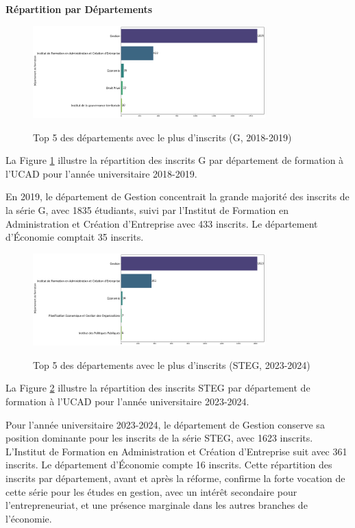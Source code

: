 \textbf{Répartition par Départements}

\begin{figure}[ht]
\centering
\caption{Top 5 des départements avec le plus d'inscrits (G, 2018-2019)}
\includegraphics[width=0.8\textwidth]{figure/dep_G_2019.png}
\label{fig:dep_g_2019}
\end{figure}

La Figure \ref{fig:dep_g_2019} illustre la répartition des inscrits G par département de formation à l'UCAD pour l'année universitaire 2018-2019.

En 2019, le département de Gestion concentrait la grande majorité des inscrits de la série G, avec 1835 étudiants, suivi par l'Institut de Formation en Administration et Création d'Entreprise avec 433 inscrits. Le département d'Économie comptait 35 inscrits.


\begin{figure}[ht]
\centering
\caption{Top 5 des départements avec le plus d'inscrits (STEG, 2023-2024)}
\includegraphics[width=0.8\textwidth]{figure/dep_STEG_2024.png}
\label{fig:dep_steg_2024}
\end{figure}

La Figure \ref{fig:dep_steg_2024} illustre la répartition des inscrits STEG par département de formation à l'UCAD pour l'année universitaire 2023-2024.

Pour l'année universitaire 2023-2024, le département de Gestion conserve sa position dominante pour les inscrits de la série STEG, avec 1623 inscrits. L'Institut de Formation en Administration et Création d'Entreprise suit avec 361 inscrits. 
Le département d'Économie compte 16 inscrits. Cette répartition des inscrits par département, avant et après la réforme, confirme la forte vocation de cette série pour les études en gestion, avec un intérêt secondaire pour l'entrepreneuriat, et une présence marginale dans les autres branches de l'économie. 

